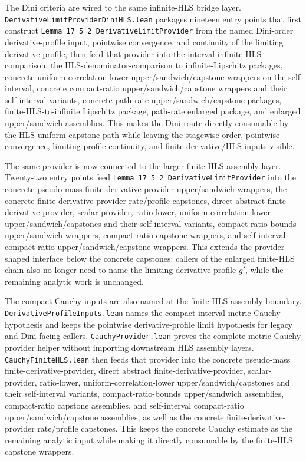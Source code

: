 \documentclass[a4paper,11pt]{article}
\begin{document}
The Dini criteria are wired to the same infinite-HLS bridge layer.
\texttt{DerivativeLimitProviderDiniHLS.lean} packages nineteen entry points
that
first construct \texttt{Lemma\_17\_5\_2\_DerivativeLimitProvider} from the
named Dini-order derivative-profile input, pointwise convergence, and
continuity of the limiting derivative profile, then feed that provider into the
interval infinite-HLS comparison, the HLS-denominator-comparison to
infinite-Lipschitz packages, concrete uniform-correlation-lower
upper/sandwich/capstone wrappers on the self interval, concrete compact-ratio
upper/sandwich/capstone
wrappers and their self-interval variants, concrete path-rate
upper/sandwich/capstone packages,
finite-HLS-to-infinite Lipschitz package, path-rate enlarged package, and
enlarged upper/sandwich assemblies.  This makes the Dini route directly
consumable by the HLS-uniform capstone path while leaving the stagewise order,
pointwise convergence, limiting-profile continuity, and finite derivative/HLS
inputs visible.

The same provider is now connected to the larger finite-HLS assembly layer.
Twenty-two entry points feed \texttt{Lemma\_17\_5\_2\_DerivativeLimitProvider}
into the concrete pseudo-mass finite-derivative-provider upper/sandwich
wrappers, the concrete finite-derivative-provider rate/profile capstones,
direct abstract finite-derivative-provider, scalar-provider, ratio-lower,
uniform-correlation-lower upper/sandwich/capstones and their self-interval variants,
compact-ratio-bounds upper/sandwich wrappers,
compact-ratio capstone wrappers, and self-interval compact-ratio
upper/sandwich/capstone wrappers.
This extends the provider-shaped interface below the concrete capstones:
callers of the enlarged finite-HLS chain also no longer need to name the
limiting derivative profile \(g'\), while the remaining analytic work is
unchanged.

The compact-Cauchy inputs are also named at the finite-HLS assembly boundary.
\texttt{DerivativeProfileInputs.lean} names the compact-interval metric Cauchy
hypothesis and keeps the pointwise derivative-profile limit hypothesis for
legacy and Dini-facing callers.  \texttt{CauchyProvider.lean} proves the
complete-metric Cauchy provider helper without importing downstream HLS
assembly layers.  \texttt{CauchyFiniteHLS.lean} then feeds that provider into the
concrete pseudo-mass finite-derivative-provider, direct abstract
finite-derivative-provider, scalar-provider, ratio-lower,
uniform-correlation-lower upper/sandwich/capstones and their self-interval variants,
compact-ratio-bounds upper/sandwich assemblies,
compact-ratio capstone assemblies, and self-interval compact-ratio
upper/sandwich/capstone assemblies,
as well as the concrete finite-derivative-provider rate/profile capstones.
This keeps the concrete Cauchy estimate as the remaining analytic input while
making it directly consumable by the finite-HLS capstone wrappers.
\end{document}
